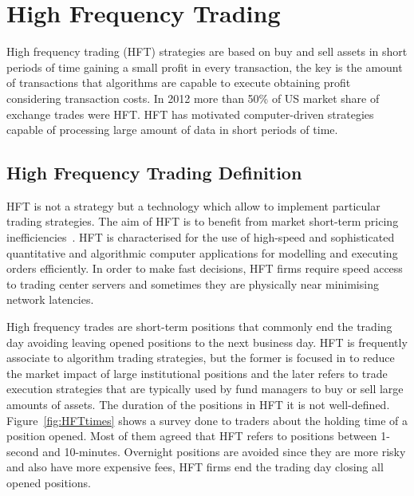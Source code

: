 \chapter{High Frequency Trading}

High frequency trading (HFT) strategies are based on buy and sell assets in
short periods of time gaining a small profit in every transaction, the key is
the amount of transactions that algorithms are capable to execute obtaining profit considering transaction costs. 
In 2012 more than 50\% of US market share of exchange trades were HFT.  HFT has
motivated computer-driven strategies capable of processing large amount of data
in short periods of time. 


\section{High Frequency Trading Definition}

HFT is not a strategy but a technology which allow to implement particular
trading strategies. The aim of HFT is to benefit from market short-term pricing
inefficiencies~\cite{chlistalla2011}. HFT is characterised for the use of
high-speed and sophisticated quantitative and algorithmic computer applications
for modelling and executing orders efficiently. In order to make fast decisions,
HFT firms require speed access to trading center servers and sometimes they are
physically near minimising network latencies.

High frequency trades are short-term positions that commonly end the trading
day avoiding leaving opened positions to the next business day. HFT is
frequently associate to algorithm trading strategies, but the former is focused
in to reduce the market impact of large institutional positions and the later refers to trade execution strategies that are typically used by fund managers to buy or sell large amounts of assets. The duration of the positions in HFT it is not well-defined. Figure~\ref{fig:HFTtimes} shows a survey done to traders about the holding time
of a position opened. Most of them agreed that HFT refers to positions between
1-second and 10-minutes. Overnight positions are avoided since they are more
risky and also have more expensive fees, HFT firms end the trading day closing all
opened positions.

